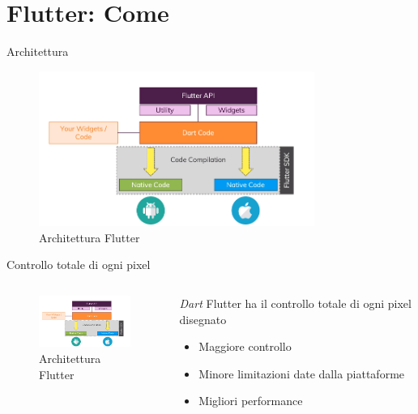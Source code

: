 \documentclass{../libs/presentation_format}
\begin{document}

\section{Flutter: Come}
\begin{frame}{Architettura}
	\begin{figure}[htpb]
		\centering
		\includegraphics[width=9cm]{../libs/flutter-architecture}
		\caption{Architettura Flutter}
		\label{fig: Architettura Flutter}
	\end{figure}
\end{frame}


\begin{frame}{Controllo totale di ogni pixel}
	\begin{minipage}[0.2\textheight]{\textwidth}
		\begin{columns}[T]
			\begin{column}{0.4\textwidth}
				\begin{figure}[htpb]
					\centering
					\includegraphics[width=4cm]{../libs/flutter-architecture}
					\caption{Architettura Flutter}
					\label{fig:Architettura Flutter}
				\end{figure}
			\end{column}
			\begin{column}{0.6\textwidth}
				\emph{Dart}
				\newline
				Flutter ha il controllo totale di ogni pixel disegnato
				\begin{itemize}
					\item Maggiore controllo
					\item Minore limitazioni date dalla piattaforme
					\item Migliori performance
				\end{itemize}
			\end{column}
		\end{columns}
	\end{minipage}
\end{frame}
\end{document}
